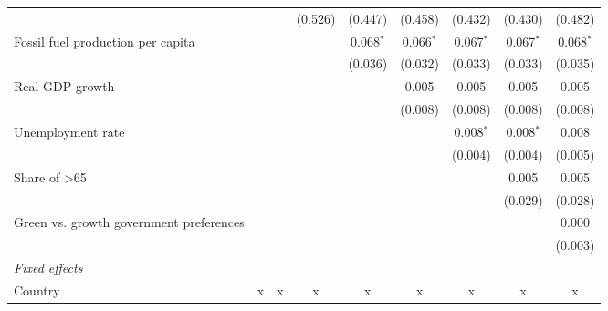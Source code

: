 \begin{table}[htbp]
\begin{tabular}{lcccccccc}
                                                                &                &         & (0.526) & (0.447)     & (0.458)     & (0.432)     & (0.430)     & (0.482)\\   
      Fossil fuel production per capita                         &                &         &         & 0.068$^{*}$ & 0.066$^{*}$ & 0.067$^{*}$ & 0.067$^{*}$ & 0.068$^{*}$\\   
                                                                &                &         &         & (0.036)     & (0.032)     & (0.033)     & (0.033)     & (0.035)\\   
      Real GDP growth                                           &                &         &         &             & 0.005       & 0.005       & 0.005       & 0.005\\   
                                                                &                &         &         &             & (0.008)     & (0.008)     & (0.008)     & (0.008)\\   
      Unemployment rate                                         &                &         &         &             &             & 0.008$^{*}$ & 0.008$^{*}$ & 0.008\\   
                                                                &                &         &         &             &             & (0.004)     & (0.004)     & (0.005)\\   
      Share of >65                                              &                &         &         &             &             &             & 0.005       & 0.005\\   
                                                                &                &         &         &             &             &             & (0.029)     & (0.028)\\   
      Green vs. growth government preferences                   &                &         &         &             &             &             &             & 0.000\\   
                                                                &                &         &         &             &             &             &             & (0.003)\\   
      \emph{Fixed effects}\\
      Country                                                   & x              & x       & x       & x           & x           & x           & x           & x\\  

\end{tabular}
\end{table}
